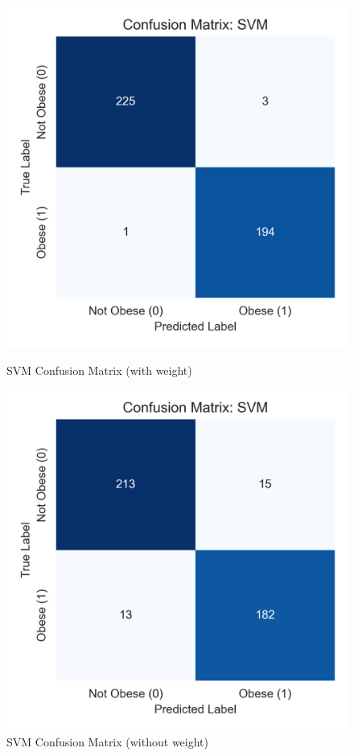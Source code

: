 \documentclass[a4paper,12pt]{article}
\begin{document}
\begin{figure}[H]
\centering
\begin{minipage}{0.35\textwidth}
    \centering
    \includegraphics[width=\linewidth]{svm_confusion.png}
    \caption{SVM Confusion Matrix (with weight)}
\end{minipage}
\hspace{0.04\textwidth}
\begin{minipage}{0.35\textwidth}
    \centering
    \includegraphics[width=\linewidth]{svm_confusion_withoutWeight.png}
    \caption{SVM Confusion Matrix (without weight)}
\end{minipage}
\label{fig:SVM_comparison}
\end{figure}
\end{document}
